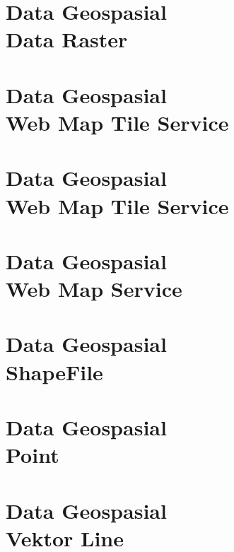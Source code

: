 \documentclass{WileySix}
\begin{document}
\chapter[Data Raster]
{Data Geospasial\\ Data Raster}



%

\chapter[Open Geospatial Consortium]
{Data Geospasial\\ Web Map Tile Service}


\chapter[Web Map Tile Service]
{Data Geospasial\\ Web Map Tile Service}


\chapter[Web Map Service]
{Data Geospasial\\ Web Map Service}



\chapter[Shapefile]
{Data Geospasial\\ ShapeFile}


\chapter[Shapefile Point]
{Data Geospasial\\ Point}


\chapter[Data Vektor Line]
{Data Geospasial\\ Vektor Line}

\end{document}
